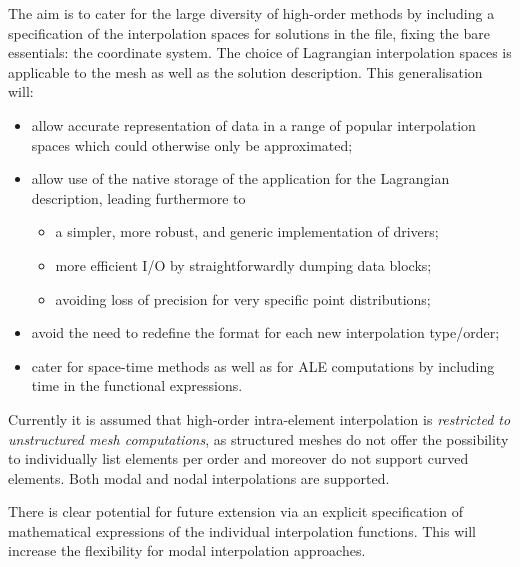 \documentclass[11pt,letterpaper]{article}
\newenvironment{v2quote}
  {\begin{v2quoteframe}%
   \noindent{\footnotesize\sffamily\bfseries\color{cgnsblue}v2 text}%
   \nopagebreak\par\nopagebreak\vspace{0.15em}}
  {\end{v2quoteframe}}
\begin{document}
\begin{v2quote}
The aim is to cater for the large diversity of high-order methods by including a specification of
the interpolation spaces for solutions in the file, fixing the bare essentials: the coordinate
system.  The choice of Lagrangian interpolation spaces is applicable to the mesh as well as the
solution description.  This generalisation will:

\begin{itemize}[leftmargin=2em]
  \item allow accurate representation of data in a range of popular interpolation spaces which
    could otherwise only be approximated;
  \item allow use of the native storage of the application for the Lagrangian description, leading
    furthermore to
    \begin{itemize}
      \item a simpler, more robust, and generic implementation of drivers;
      \item more efficient I/O by straightforwardly dumping data blocks;
      \item avoiding loss of precision for very specific point distributions;
    \end{itemize}
  \item avoid the need to redefine the format for each new interpolation type/order;
  \item cater for space-time methods as well as for ALE computations by including time in the
    functional expressions.
\end{itemize}

Currently it is assumed that high-order intra-element interpolation is \emph{restricted to
unstructured mesh computations}, as structured meshes do not offer the possibility to
individually list elements per order and moreover do not support curved elements.  Both modal and
nodal interpolations are supported.

There is clear potential for future extension via an explicit specification of mathematical
expressions of the individual interpolation functions.  This will increase the flexibility for
modal interpolation approaches.
\end{v2quote}
\end{document}
